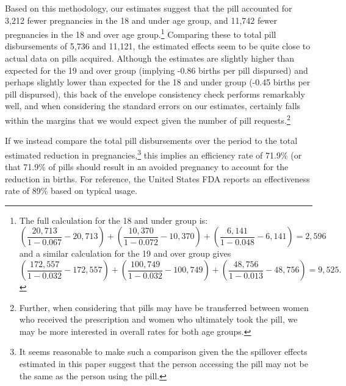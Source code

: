 \documentclass[11pt,subeqn]{article}
\begin{document}
\begin{spacing}{1.4}
Based on this methodology, our estimates suggest that the pill accounted for 
3,212 fewer pregnancies in the 18 and under age group, and 11,742 fewer 
pregnancies in the 18 and over age group.\footnote{The full calculation for the 
18 and under group is:
\begin{equation}
\nonumber
\left(\frac{20,713}{1-0.067}-20,713\right)+
\left(\frac{10,370}{1-0.072}-10,370\right)+
\left(\frac{6,141}{1-0.048}-6,141\right)=2,596
\end{equation}
and a similar calculation for the 19 and over group gives 
\begin{equation}
\nonumber
\left(\frac{172,557}{1-0.032}-172,557\right)+
\left(\frac{100,749}{1-0.032}-100,749\right)+
\left(\frac{48,756}{1-0.013}-48,756\right)=9,525.
\end{equation}
}
Comparing these to total pill disbursements of 5,736 and 11,121, the estimated
effects seem to be quite close to actual data on pills acquired.  Although the
estimates are slightly higher than expected for the 19 and over group (implying
-0.86 births per pill dispursed) and perhaps slightly lower than expected for the
18 and under group (-0.45 births per pill dispursed), this back of the envelope 
consistency check performs remarkably well, and when considering the standard 
errors on our estimates, certainly falls within the margins that we would expect
given the number of pill requests.\footnote{Further, when considering that
pills may have be transferred between women who received the prescription and
women who ultimately took the pill, we may be more interested in overall rates
for both age groups.}

If we instead compare the total pill disbursements over the period to the 
total estimated reduction in pregnancies,\footnote{It seems reasonable to make 
such a comparison given the the spillover effects estimated in this paper suggest 
that the person accessing the pill may not be the same as the person using the 
pill.}  this implies an efficiency rate of 71.9\% (or that 71.9\% of pills should 
result in an avoided pregnancy to account for the reduction in births.  For 
reference, the United States FDA reports an effectiveness rate of 89\% based on
typical usage.





\newpage



\end{spacing}
\end{document}
